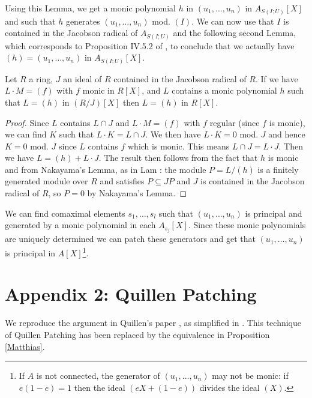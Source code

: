  Using this Lemma, we get a monic polynomial $h$ in $(u_1,\dots,u_n)$ in $A_{S(I;U)}[X]$
 and such that $h$ generates $(u_1,\dots,u_n)$ mod. $(I)$.
 We can now use that $I$ is contained in the Jacobson radical of $A_{S(I;U)}$ and the
 following second Lemma, which corresponds to Proposition IV.5.2 of \cite{Lam},
 to conclude that we actually have $(h) = (u_1,\dots,u_n)$ in $A_{S(I;U)}[X]$.

\begin{lemma}
  Let $R$ a ring, $J$ an ideal of $R$ contained in the Jacobson radical of $R$. If
  we have $L\cdot M = (f)$ with $f$ monic in $R[X]$, and $L$ contains a monic polynomial
  $h$ such that $L = (h)$ in $(R/J)[X]$ then $L = (h)$ in $R[X]$.
\end{lemma}

\begin{proof}
  Since $L$ contains $L\cap J$ and $L\cdot M = (f)$ with $f$ regular (since $f$ is monic),
  we can find $K$   such that $L\cdot K = L\cap J$.
  We then have $L\cdot K = 0$ mod. $J$ and hence $K = 0$ mod. $J$ since $L$ contains $f$
  which is monic.
  This means $L\cap J = L\cdot J$. Then we have $L = (h) + L\cdot J$.
  The result then follows from the fact that $h$ is monic and from Nakayama's Lemma, as in Lam \cite{Lam}:
  the module $P = L/(h)$ is a finitely generated module over $R$ and satisfies
  $P\subseteq JP$ and $J$ is contained in the Jacobson radical of $R$, so $P = 0$ by Nakayama's Lemma.
\end{proof}

\begin{corollary}
  We can find comaximal elements $s_1,\dots,s_l$ such that $(u_1,\dots,u_n)$ is principal and generated by a
  monic polynomial in each $A_{s_j}[X]$. Since these monic polynomials are uniquely determined
  we can patch these generators and get that $(u_1,\dots,u_n)$ is principal in $A[X]$\footnote{If $A$ is not
  connected, the generator of $(u_1,\dots,u_n)$ may not be monic: if $e(1-e)=1$ then the ideal $(eX+(1-e))$
  divides the ideal $(X)$.}.
\end{corollary}

\newpage

\section*{Appendix 2: Quillen Patching}

We reproduce the argument in Quillen's paper \cite{Quillen}, as simplified in \cite{lombardi-quitte}.
This technique of Quillen Patching has been replaced by the equivalence in Proposition \ref{Matthias}.

